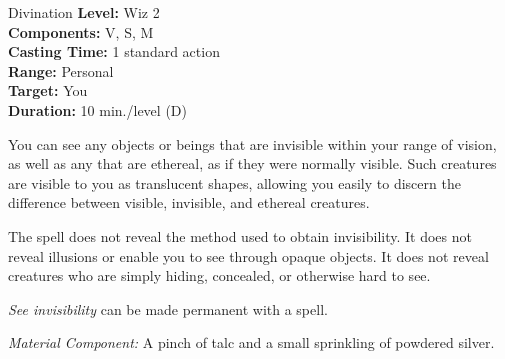 {Divination}
{
	\textbf{Level:}
	Wiz 2\\
	\textbf{Components:}
	V, S, M\\
	\textbf{Casting Time:}
	1 standard action\\
	\textbf{Range:}
	Personal\\
	\textbf{Target:}
	You\\
	\textbf{Duration:}
	10 min./level (D)\\
}
{
	You can see any objects or beings that are invisible within your range of vision, as well as any that are ethereal, as if they were normally visible. Such creatures are visible to you as translucent shapes, allowing you easily to discern the difference between visible, invisible, and ethereal creatures.

	The spell does not reveal the method used to obtain invisibility. It does not reveal illusions or enable you to see through opaque objects. It does not reveal creatures who are simply hiding, concealed, or otherwise hard to see.

	\emph{See invisibility} can be made permanent with a  spell.

	\textit{Material Component:}
	A pinch of talc and a small sprinkling of powdered silver.

}
